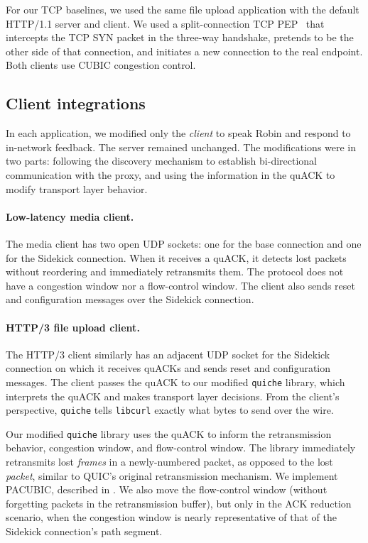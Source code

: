 For our TCP baselines, we used the same file upload application with the
default HTTP/1.1 server and client. We used a split-connection
TCP PEP~\cite{caini2006pepsal} that intercepts the TCP
SYN packet in the three-way handshake, pretends to be the other side of that
connection, and initiates a new connection to the real endpoint.
Both clients use CUBIC congestion control.

\subsection{Client integrations}
\label{sec:sidekick:implementation:client-integrations}

In each application, we modified only the \emph{client} to speak Robin
and respond to in-network feedback. The server remained unchanged.
The modifications were in two parts: following the discovery mechanism to
establish bi-directional communication with the proxy, and using the information
in the quACK to modify transport layer behavior.



\paragraph{Low-latency media client.} The media client has two open UDP sockets:
one for the base connection and one for the Sidekick connection. When it receives a
quACK, it detects lost packets without reordering and immediately retransmits
them. The protocol does not have a congestion window nor a flow-control window.
The client also sends reset and configuration messages over the Sidekick connection.

\paragraph{HTTP/3 file upload client.}
The HTTP/3 client similarly has an adjacent UDP socket for the Sidekick connection on
which it receives quACKs and sends reset and configuration messages. The client
passes the quACK to our modified \texttt{quiche} library, which interprets the
quACK and makes transport layer decisions. From the client's perspective,
\texttt{quiche} tells \texttt{libcurl} exactly what bytes to send over the wire.

Our modified \texttt{quiche} library uses the quACK to inform the
retransmission behavior, congestion window, and flow-control window. The library
immediately retransmits lost \emph{frames} in a newly-numbered
packet, as opposed to the lost \emph{packet}, similar to QUIC's original
retransmission mechanism. We implement PACUBIC,
described in .
We also move the flow-control window (without forgetting packets in the
retransmission buffer), but only in the ACK reduction scenario, when the
congestion window is nearly representative of that of the Sidekick connection's
path segment.

